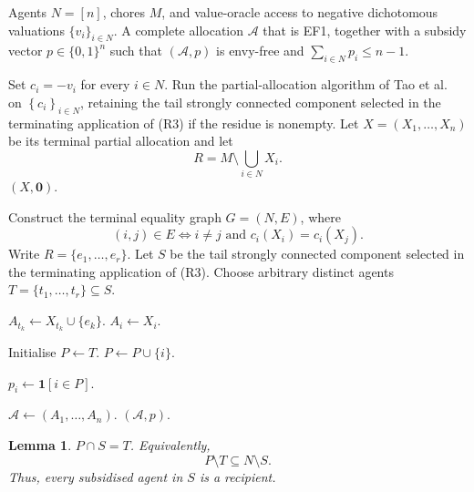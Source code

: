 \documentclass[sigconf,anonymous]{aamas}
\newcommand{\agents}{N}
\newcommand{\items}{M}
\newcommand{\cost}{c}
\newcommand{\set}[1]{\left\{#1\right\}}
\newcommand{\abs}[1]{\left\lvert#1\right\rvert}
\theoremstyle{acmplain}
\newtheorem{lemma}[theorem]{Lemma}
\theoremstyle{acmdefinition}
\theoremstyle{acmplain}
\begin{document}
\begin{algorithm}
\caption{EF1 allocation with at most one unit of subsidy per agent for negative dichotomous valuations}
\label{alg:main}
\begin{algorithmic}[1]
\Require Agents $N=[n]$, chores $M$, and value-oracle access to negative
dichotomous valuations $\{v_i\}_{i\in N}$.
\Ensure A complete allocation $\mathcal{A}$ that is EF1, together with a
subsidy vector $p\in\{0,1\}^n$ such that $(\mathcal{A},p)$ is envy-free and
$\sum_{i\in N}p_i\le n-1$.

\State Set $c_i=-v_i$ for every $i\in N$.
\State Run the partial-allocation algorithm of Tao et al.~\cite{tao2025existence} on $\set{\cost_i}_{i\in\agents}$, retaining the tail strongly connected component selected in the terminating application of  \textnormal{(R3)} if the residue is nonempty.
\State Let $X=(X_1,\dots,X_n)$ be its terminal partial allocation and let
\[
R=\items\setminus\bigcup_{i\in\agents}X_i .
       \]
    \State \Return $(X,\mathbf 0)$.
\EndIf

\State Construct the terminal equality graph $G=(\agents,E)$, where
       \[
       (i,j)\in E
       \iff
       i\neq j
       \text{ and }
       \cost_i(X_i)=\cost_i(X_j).
       \]
\State Write $R=\{e_1,\ldots,e_r\}$.
\State Let $S$ be the tail strongly connected component selected in the
       terminating application of \textnormal{(R3)}.
       \Comment{$r<\abs S$}
\State Choose arbitrary distinct agents
      $T=\{t_1,\ldots,t_r\}\subseteq S$.

    \State $A_{t_k}\gets X_{t_k}\cup\{e_k\}$.
\EndFor
{}
    \State $A_i\gets X_i$.
\EndFor

\State Initialise $P\gets T$.
    \State $P\gets P\cup\{i\}$.
\EndWhile

    \State $p_i\gets \mathbf{1}[i\in P]$.
\EndFor

\State $\mathcal{A}\gets(A_1,\ldots,A_n)$.
\State \Return $(\mathcal{A},p)$.
\end{algorithmic}
\end{algorithm}


\begin{lemma}
\label{lem:m-Pstructure}
$P\cap S=T$. Equivalently,
\[P\setminus T\subseteq \agents\setminus S.
\] Thus, every subsidised agent in $S$ is a recipient.
\end{lemma}
\end{document}
